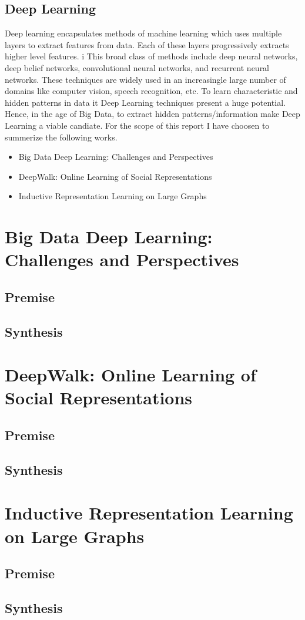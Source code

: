 \documentclass[12pt]{extarticle}
\begin{document}
\subsection{Deep Learning}
Deep learning encapsulates methods of machine learning which uses multiple layers
to extract features from data.
%
Each of these layers progressively extracts higher level features.
i%
This broad class of methods include deep neural networks, deep belief networks,
convolutional neural networks, and recurrent neural networks.
%
These techniques are widely used in an increasingle large number of domains like
computer vision, speech recognition, etc.
%
To learn characteristic and hidden patterns in data it Deep Learning techniques
present a huge potential.
\\
Hence, in the age of Big Data, to extract hidden patterns/information make
Deep Learning a viable candiate.
For the scope of this report I have choosen to summerize the following works.

\begin{itemize}
\item Big Data Deep Learning: Challenges and Perspectives~\cite{chen2014big}
\item DeepWalk: Online Learning of Social Representations~\cite{perozzi2014deepwalk}
\item Inductive Representation Learning on Large Graphs~\cite{hamilton2017inductive}
\end{itemize}

\section{Big Data Deep Learning: Challenges and Perspectives}
\subsection{Premise}
\subsection{Synthesis}

\section{DeepWalk: Online Learning of Social Representations}
\subsection{Premise}
\subsection{Synthesis}

\section{Inductive Representation Learning on Large Graphs}
\subsection{Premise}
\subsection{Synthesis}



\end{document}
